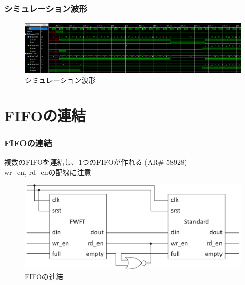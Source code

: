 ﻿\documentclass[dvipdfmx]{beamer}
\begin{document}
\begin{frame}
	\frametitle{シミュレーション波形}
	\begin{figure}[ht]
		\centering
		\includegraphics[width=\linewidth]{../img/cmp_fifo.PNG}
		\caption{シミュレーション波形}
			\label{img:cmp_fifo}
	\end{figure}
\end{frame}

\section{FIFOの連結}
\begin{frame}
	\frametitle{FIFOの連結}
	複数のFIFOを連結し、1つのFIFOが作れる (AR\# 58928)\\
	wr\_en, rd\_enの配線に注意
	\pause
	\begin{figure}[ht]
		\centering
		\includegraphics[width=\linewidth]{../img/fifo_join.pdf}
		\caption{FIFOの連結}
		\label{img:fifo_join}
	\end{figure}
\end{frame}
\end{document}
